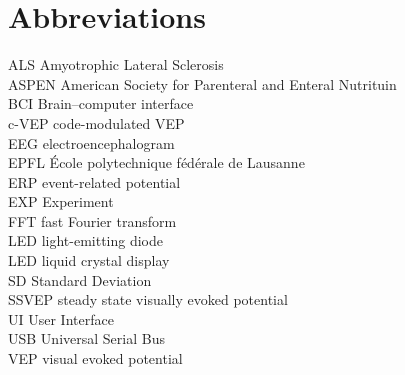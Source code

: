 \chapter{Abbreviations}
ALS	Amyotrophic Lateral Sclerosis\\
ASPEN	American Society for Parenteral and Enteral Nutrituin\\
BCI	Brain–computer interface\\
c-VEP	code-modulated VEP\\
EEG	electroencephalogram\\
EPFL	École polytechnique fédérale de Lausanne\\
ERP	event-related potential\\
EXP	Experiment\\
FFT	fast Fourier transform\\
LED	light-emitting diode\\
LED	liquid crystal display\\
SD	Standard Deviation\\
SSVEP	steady state visually evoked potential\\
UI	User Interface\\
USB	Universal Serial Bus\\
VEP	visual evoked potential\\
